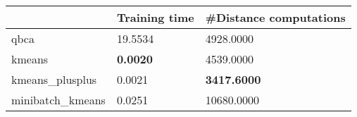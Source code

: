 \begin{table}[htbp]
\centering
\begin{tabular}{lll}
\toprule
 & Training time & #Distance computations \\
\midrule
qbca & 19.5534 & 4928.0000 \\
kmeans & \textbf{0.0020} & 4539.0000 \\
kmeans_plusplus & 0.0021 & \textbf{3417.6000} \\
minibatch_kmeans & 0.0251 & 10680.0000 \\
\bottomrule
\end{tabular}
\end{table}

